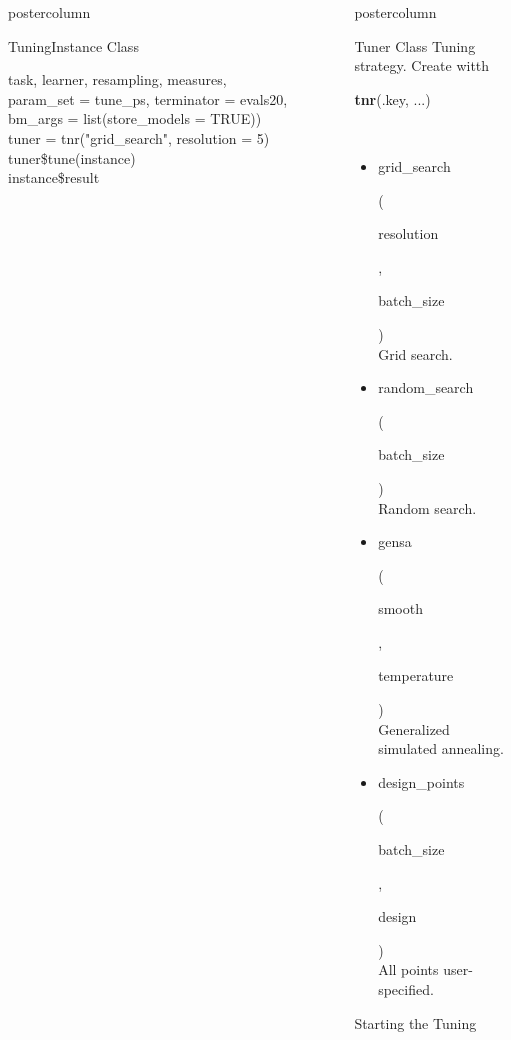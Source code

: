 \documentclass{beamer}
\newlength{\columnheight} %
\newcommand{\codeinline}[1]{\begin{codeboxinline}#1\end{codeboxinline}}
\begin{document}
\begin{frame}[fragile]{}
\begin{columns}
\begin{column}{.245\textwidth}
\begin{beamercolorbox}[center]{postercolumn}
\begin{minipage}{.98\textwidth}
{\begin{myblock}{TuningInstance Class}
\begin{codeboxexample}
{									\hspace*{1ex} task, learner, resampling, measures,\\
									\hspace*{1ex} param\_set = tune\_ps, terminator = evals20,
									\hspace*{1ex} bm\_args = list(store\_models = TRUE))\\
									tuner = tnr("grid\_search", resolution = 5)
									\vspace{1em}
									\\
									tuner\$tune(instance)\\
									instance\$result}
							\end{codeboxexample}
						\end{myblock}
						\vfill}
				\end{minipage}
			\end{beamercolorbox}
		\end{column}
		\begin{column}{.245\textwidth}
			\begin{beamercolorbox}[center]{postercolumn}
				\begin{minipage}{.98\textwidth}
					\parbox[t][\columnheight]{\textwidth}{
						\begin{myblock}{Tuner Class}
                            Tuning strategy. Create witth \codeinline{\textbf{tnr}(.key, ...)}
							\\
							\begin{itemize}
								\item \codeinline{grid\_search}
								(\codeinline{resolution}, \codeinline{batch\_size})\\
								Grid search.
								\item \codeinline{random\_search}
								(\codeinline{batch\_size})\\
								Random search.
								\item \codeinline{gensa}
								(\codeinline{smooth}, \codeinline{temperature})\\
								Generalized simulated annealing.
								\item \codeinline{design\_points}
								(\codeinline{batch\_size }, \codeinline{design})\\
								All points user-specified.
							\end{itemize}
						\end{myblock}
						\begin{myblock}{Starting the Tuning}
							\begin{codebox}

\end{codebox}
\end{myblock}}
\end{minipage}
\end{beamercolorbox}
\end{column}
\end{columns}
\end{frame}
\end{document}
